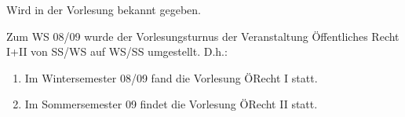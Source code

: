 \begin{course}
\begin{literature}
 

Wird in der Vorlesung bekannt gegeben.

\end{literature}

\begin{remarks}Zum WS 08/09 wurde der Vorlesungsturnus der Veranstaltung Öffentliches Recht I+II von SS/WS auf WS/SS umgestellt.\newline
D.h.:

 \begin{enumerate}\item Im Wintersemester 08/09 fand die Vorlesung ÖRecht I statt.  \item Im Sommersemester 09 findet die Vorlesung ÖRecht II statt.  \end{enumerate}\end{remarks}

\end{course}